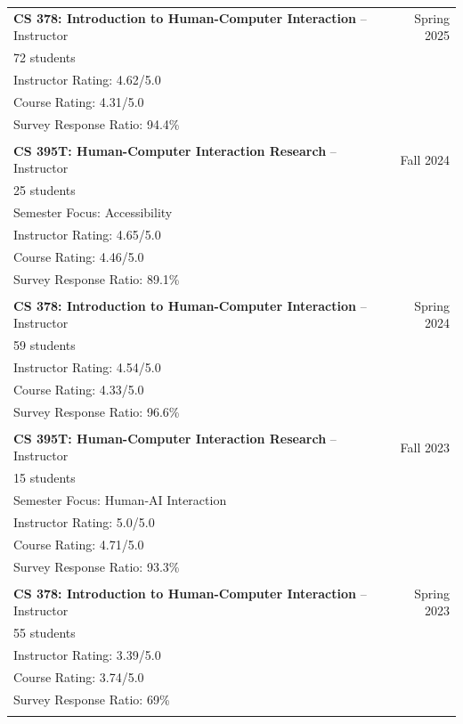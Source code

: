 \begin{longtable}{Xr}
	\textbf{CS 378: Introduction to Human-Computer Interaction} -- Instructor & Spring 2025 \\
	72 students &  \\
	Instructor Rating: 4.62/5.0 &  \\
	Course Rating: 4.31/5.0 &  \\
	Survey Response Ratio: 94.4\% &  \\
	\\

	\textbf{CS 395T: Human-Computer Interaction Research} -- Instructor & Fall 2024 \\
	25 students &  \\
	Semester Focus: Accessibility &  \\
	Instructor Rating: 4.65/5.0 &  \\
	Course Rating: 4.46/5.0 &  \\
	Survey Response Ratio: 89.1\% &  \\
	\\

	\textbf{CS 378: Introduction to Human-Computer Interaction} -- Instructor & Spring 2024 \\
	59 students &  \\
	Instructor Rating: 4.54/5.0 &  \\
	Course Rating: 4.33/5.0 &  \\
	Survey Response Ratio: 96.6\% &  \\
	\\

	\textbf{CS 395T: Human-Computer Interaction Research} -- Instructor & Fall 2023 \\
	15 students &  \\
	Semester Focus: Human-AI Interaction &  \\
	Instructor Rating: 5.0/5.0 &  \\
	Course Rating: 4.71/5.0 &  \\
	Survey Response Ratio: 93.3\% &  \\
	\\

	\textbf{CS 378: Introduction to Human-Computer Interaction} -- Instructor & Spring 2023 \\
	55 students &  \\
	Instructor Rating: 3.39/5.0 &  \\
	Course Rating: 3.74/5.0 &  \\
	Survey Response Ratio: 69\% &  \\
	\\


\end{longtable}
